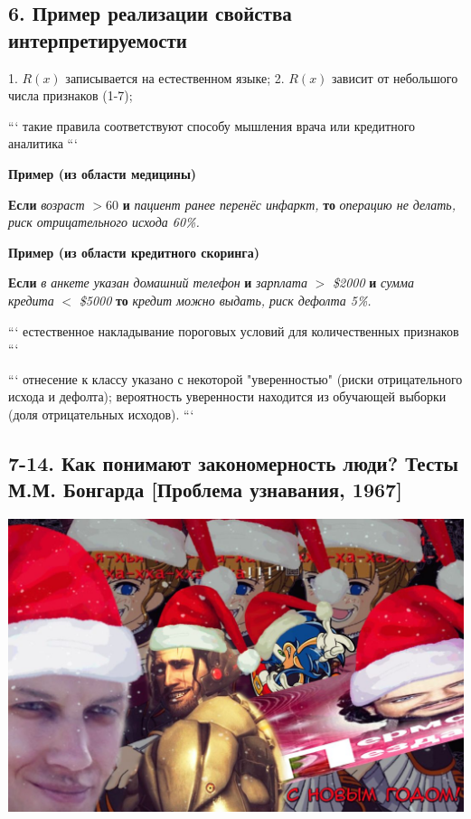 \subsection{6. Пример реализации свойства интерпретируемости}

1. $R(x)$ записывается на естественном языке;
2. $R(x)$ зависит от небольшого числа признаков (1-7);

```
такие правила соответствуют способу мышления врача или кредитного аналитика
```

\textbf{Пример (из области медицины)}

\textbf{Если} \textit{возраст} $> 60$ \textbf{и} \textit{пациент ранее перенёс инфаркт,} \textbf{то}
\textit{операцию не делать, риск отрицательного исхода 60\%.}

\textbf{Пример (из области кредитного скоринга)}

\textbf{Если} \textit{в анкете указан домашний телефон} \textbf{и} \textit{зарплата} $>$ \textit{\$2000} \textbf{и} \textit{сумма кредита} $<$ \textit{\$5000} \textbf{то}
\textit{кредит можно выдать, риск дефолта 5\%.}

```
естественное накладывание пороговых условий для количественных признаков
```

```
отнесение к классу указано с некоторой "уверенностью" (риски отрицательного
исхода и дефолта); вероятность уверенности находится из обучающей выборки
(доля отрицательных исходов).
```

\subsection{7-14. Как понимают закономерность люди? Тесты М.М. Бонгарда [Проблема узнавания, 1967]}

\includegraphics[scale=0.3]{figures/samplefigure.jpg}

